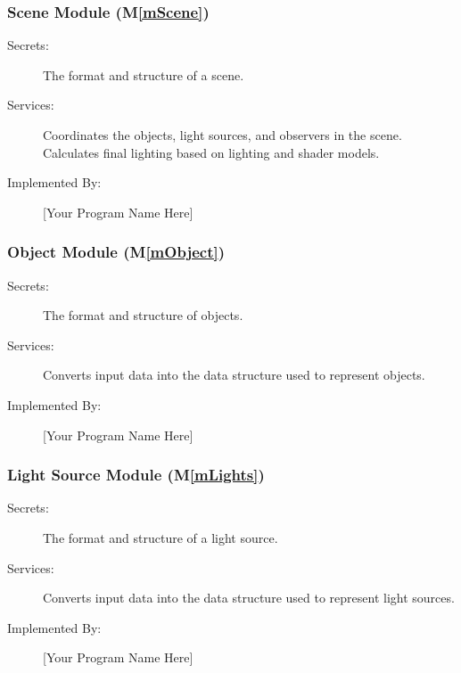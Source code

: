 \documentclass[12pt, titlepage]{article}
\newcommand{\mref}[1]{M\ref{#1}}
\begin{document}
%

\subsubsection{Scene Module (\mref{mScene})}

\begin{description}
	\item[Secrets:]The format and structure of a scene.
	\item[Services:]Coordinates the objects, light sources, and observers in 
	the scene. Calculates final lighting based on lighting and shader models.
	\item[Implemented By:] [Your Program Name Here]
\end{description}

\subsubsection{Object Module (\mref{mObject})}

\begin{description}
	\item[Secrets:]The format and structure of objects.
	\item[Services:]Converts input data into the data structure used to 
	represent objects.
	\item[Implemented By:] [Your Program Name Here]
\end{description}

\subsubsection{Light Source Module (\mref{mLights})}

\begin{description}
	\item[Secrets:]The format and structure of a light source.
	\item[Services:]Converts input data into the data structure used to 
	represent light sources.
	\item[Implemented By:] [Your Program Name Here]
\end{description}
\end{document}
